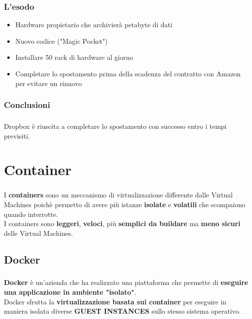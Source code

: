 \documentclass[a4paper, 12pt]{report}
\begin{document}
        \subsection{L'esodo}
        \begin{itemize}
          \item Hardware propietario che archivierà petabyte di dati
          \item Nuovo codice ("Magic Pocket")
          \item Installare 50 rack di hardware al giorno
          \item Completare lo spostamento prima della scadenza del contratto con Amazon per evitare un rinnovo
        \end{itemize}
        \subsection{Conclusioni}
        \paragraph{}Dropbox è riuscita a completare lo spostamento con successo entro i tempi previsiti.
    \chapter{Container}
    \paragraph{}I \textbf{containers} sono un meccanismo di virtualizzazione differente dalle Virtual Machines poichè 
    permetto di avere più istanze \textbf{isolate} e \textbf{volatili} che scompaiono quando interrotte.\\
    I containers sono \textbf{leggeri}, \textbf{veloci}, più \textbf{semplici da buildare} ma \textbf{meno sicuri} delle Virtual Machines.
    \section{Docker}
    \paragraph{}\textbf{Docker} è un'azienda che ha realizzato una piattaforma che permette di \textbf{eseguire una applicazione in ambiente "isolato"}.\\
    Docker sfrutta la \textbf{virtualizzazione basata sui container} per eseguire in maniera isolata diverse \textbf{GUEST INSTANCES} sullo stesso sistema operativo.
\end{document}
